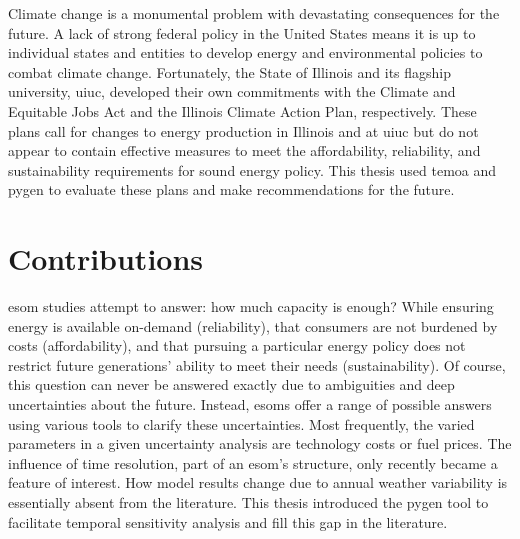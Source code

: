 Climate change is a monumental problem with devastating consequences for the future.
A lack of strong federal policy in the United States means it is up to individual
states and entities to develop energy and environmental policies to combat climate
change. Fortunately, the State of Illinois and its flagship university, \gls{uiuc},
developed their own commitments with the Climate and Equitable Jobs Act and
the Illinois Climate Action Plan, respectively. These plans call for changes
to energy production in Illinois and at \gls{uiuc} but do not appear to
contain effective measures
to meet the affordability, reliability, and sustainability requirements for sound
energy policy. This thesis used \gls{temoa} and \gls{pygen} to evaluate these
plans and make recommendations for the future.

\section{Contributions}

\gls{esom} studies attempt to answer: how much capacity is enough? While
ensuring energy is available on-demand (reliability), that consumers are not
burdened by costs (affordability), and that pursuing a particular energy policy
does not restrict future generations' ability to meet their needs (sustainability).
Of course, this question can never be answered exactly due to ambiguities and deep
uncertainties about the future. Instead, \glspl{esom} offer a range of possible answers
using various tools to clarify these uncertainties. Most frequently, the varied
parameters in a given uncertainty analysis are technology
costs or fuel prices. The influence of time resolution, part of an \gls{esom}'s
structure, only recently became a feature of interest. How model results change
due to annual weather variability is essentially absent from the literature.
This thesis introduced the \gls{pygen} tool to facilitate temporal sensitivity
analysis and fill this gap in the literature.

